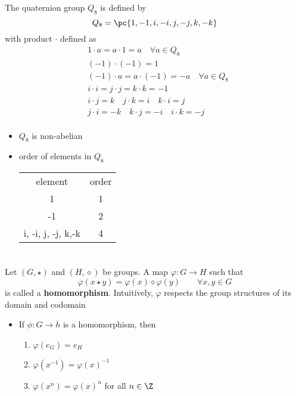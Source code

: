 \documentclass[11pt]{article}
\begin{document}
\begin{definition*}
     The quaternion group $Q_8$ is defined by 
    \[
        Q_8 = \pc{
            1, -1, i, -i, j, -j, k, -k
        }    
    \]
    with product $\cdot$ defined as 
    \begin{align*}
        &1 \cdot a = a \cdot 1 = a \quad \forall a\in Q_8 \\ 
        &(-1) \cdot (-1) = 1 \\ 
        &(-1) \cdot a = a \cdot (-1) = -a \quad \forall a\in Q_8 \\ 
        &i \cdot i = j \cdot j = k \cdot k = -1 \\
        &i\cdot j = k \quad j \cdot k = i \quad k \cdot i = j \\ 
        &j\cdot i = -k \quad k \cdot j = -i \quad i \cdot k = -j \\ 
    \end{align*}
    \begin{itemize}
        \item {} $Q_8$ is non-abelian
        \item {} order of elements in $Q_8$
        \begin{center}
            \begin{tabular}{c|c}
                element & order \\
                1 & 1 \\
                -1 & 2 \\ 
                i, -i, j, -j, k,-k & 4 \\
            \end{tabular}
        \end{center}
    \end{itemize}
\end{definition*}


\section{}


\begin{definition*}
     Let $(G,\star)$ and $(H,\diamond)$ be groups. A map $\varphi:G\to H$ such that 
    \[
        \varphi(x\star y) = \varphi(x) \diamond \varphi(y)
        \quad \quad
        \forall x,y\in G    
    \]
    is called a \textbf{homomorphism}. Intuitively, $\varphi$ respects the group structures of its domain and codomain
    \begin{itemize}
        \item {} If $\phi: G\to h$ is a homomorphism, then 
        \begin{enumerate}
            \item $\varphi(e_G) = e_H$
            \item $\varphi(x^{-1}) = \varphi(x)^{-1}$
            \item $\varphi(x^n) = \varphi(x)^n$ for all $n\in\Z$
        \end{enumerate}
    \end{itemize}
\end{definition*}
\end{document}
